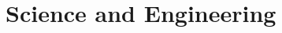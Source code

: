 \section{Science and Engineering}







\begin{comment}
List branches of science and which areas of math are especially important in those:
-Chemistry:
 -Group Theory
 -Quantum Mechanics
-Biology:
 -Differential equations
 -Cellular Automata
 -String replacement systems (Lindenmayer systems)
 -String matching (DNA comparison)
 -Knot Theory (protein strutures)
-Social Sciences:
 -Statistics
-Mechanical Engineering:
 -Linear Algebra (matrices for trusses, etc) 
 -Tensor calculus (due to continuum mechanics)
 -Fourier Theory (vibrations, etc.)
-Electrical Engineering:
 -Complex numbers
 -Fourier- and Laplace Transforms 
-Machine Learning:
 -Multivariate Optimization, Approximation, Fitting, Manifolds
-Computer graphics:
 -Linear algebra
 -Quaternions
 -Projective geometry
 -Geometric Algebra
 -Analytic Geometry


\end{comment}